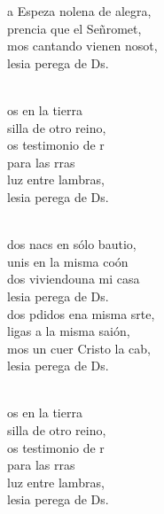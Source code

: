 \documentclass[12pt]{article}
\begin{document}
\begin{multicols*}{2}
\begin{cancion}
	a Espeza nolena de alegra,\\
	prencia que el Señromet, \\
	mos cantando vienen nosot,\\
	lesia perega de Ds.\\\jump\\
	\begin{chorus}%
	os en la tierra \\
	silla de otro reino,\\
	os testimonio de r\\
	 para las rras\\
	luz entre lambras,\\
	lesia perega de Ds.\\
	\end{chorus}%
	\jump\\
	dos nacs en sólo bautio,\\
	unis en la misma coón\\
	dos viviendouna mi casa \\
	lesia perega de Ds.\\
	dos pdidos ena misma srte,\\
	ligas a la misma saión,\\
	mos un cuer Cristo la cab,\\
	lesia perega de Ds.\\\jump\\
	\begin{chorus}%
	os en la tierra \\
	silla de otro reino,\\
	os testimonio de r\\
	 para las rras\\
	luz entre lambras,\\
	lesia perega de Ds.\\
	\end{chorus}%
	\jump\\
\end{cancion}%


\end{multicols*}
\end{document}
